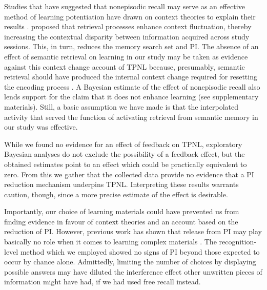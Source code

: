\documentclass[../main.tex]{subfiles}
\begin{document}
Studies that have suggested that nonepisodic recall may serve as an effective
method of learning potentiation have drawn on context theories 
to explain their results \citep{divisRetrievalSpeedsContext2014, 
pastotterRetrievalLearningFacilitates2011}. 
\cite{divisRetrievalSpeedsContext2014} proposed that retrieval processes 
enhance context fluctuation, thereby increasing the contextual disparity 
between information acquired across study sessions. This, in turn, reduces 
the memory search set and PI. The absence of an effect of semantic retrieval 
on learning in our study may be taken as evidence against this context 
change account of TPNL because, presumably, semantic retrieval should have 
produced the internal context change required for resetting the encoding 
process \citep{pastotterRetrievalLearningFacilitates2011}. A Bayesian 
estimate of the effect of nonepisodic recall also lends support for the 
claim that it does not enhance learning (see supplementary materials). 
Still, a basic assumption we have made is that the interpolated activity 
that served the function of activating retrieval from semantic memory in our 
study was effective. 

While we found no evidence for an effect of feedback on TPNL, exploratory 
Bayesian analyses do not exclude the possibility of a feedback effect, but 
the obtained estimates point to an effect which could be practically 
equivalent to zero. From this we gather that the collected data provide no 
evidence that a PI reduction mechanism underpins TPNL. Interpreting these 
results warrants caution, though, since a more precise estimate of the 
effect is desirable.

Importantly, our choice of learning materials could have prevented us from 
finding evidence in favour of context theories and an account based on the 
reduction of PI. However, previous work has shown that release from PI may 
play basically no role when it comes to learning complex materials 
\citep{divisRetrievalSpeedsContext2014, wissmanInterimTestEffect2011}. The 
recognition-level method which we employed showed no signs of PI beyond 
those expected to occur by chance alone. Admittedly, limiting the number of 
choices by displaying possible answers may have diluted the interference 
effect other unwritten pieces of information might have had, if we had used 
free recall instead.
\end{document}
